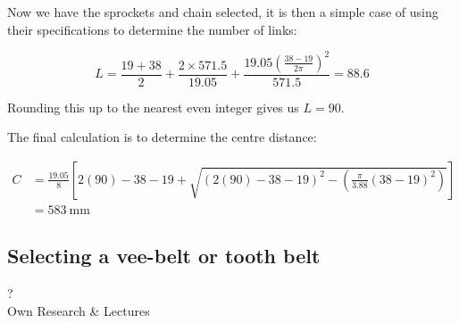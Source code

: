 Now we have the sprockets and chain selected, it is then a simple case of using their specifications to determine the number of links:

\begin{equation}
  L = 
  \frac{19+38}{2}
  +
  \frac{2\times571.5}{19.05}+\frac{19.05{\left(\frac{38-19}{2\pi}\right)}^2}{571.5} = 88.6
\end{equation}

Rounding this up to the nearest even integer gives us \(L=90\).

The final calculation is to determine the centre distance:

\begin{equation}
\begin{split}
  C & = \frac{19.05}{8}
  \left[
  2(90)-38-19 
  +
  \sqrt{ 
    {\left(2(90)-38-19\right)}^2 - \left(\frac{\pi}{3.88}\left(38-19\right)^2\right)
  }
  \right] 
  \\ & = \SI{583}{\milli\metre}
\end{split}
\end{equation}

\subsection{Selecting a vee-belt or tooth belt}

\begin{framed}
  \vspace{1cm}
    \begin{center}
      {\fontsize{50}{60}\selectfont ?}\\
      Own Research \& Lectures
    \end{center}
  \vspace{1cm}
\end{framed}


